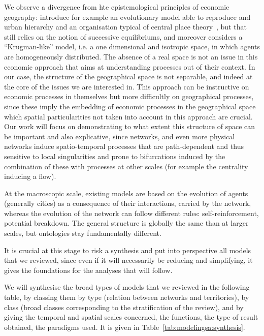 \documentclass[10pt]{article}
\begin{document}
We observe a divergence from hte epistemological principles of economic geography: \cite{fujita1999evolution} introduce for example an evolutionary model able to reproduce and urban hierarchy and an organisation typical of central place theory~\cite{banos2011christaller}, but that still relies on the notion of successive equilibriums, and moreover considers a ``Krugman-like'' model, i.e. a one dimensional and isotropic space, in which agents are homogeneously distributed. The absence of a real space is not an issue in this economic approach that aims at understanding processes out of their context. In our case, the structure of the geographical space is not separable, and indeed at the core of the issues we are interested in. This approach can be instructive on economic processes in themselves but more difficultly on geographical processes, since these imply the embedding of economic processes in the geographical space which spatial particularities not taken into account in this approach are crucial. Our work will focus on demonstrating to what extent this structure of space can be important and also explicative, since networks, and even more physical networks induce spatio-temporal processes that are path-dependent and thus sensitive to local singularities and prone to bifurcations induced by the combination of these with processes at other scales (for example the centrality inducing a flow).

At the macroscopic scale, existing models are based on the evolution of agents (generally cities) as a consequence of their interactions, carried by the network, whereas the evolution of the network can follow different rules: self-reinforcement, potential breakdown. The general structure is globally the same than at larger scales, but ontologies stay fundamentally different.

It is crucial at this stage to risk a synthesis and put into perspective all models that we reviewed, since even if it will necessarily be reducing and simplifying, it gives the foundations for the analyses that will follow.

We will synthesise the broad types of models that we reviewed in the following table, by classing them by type (relation between networks and territories), by class (broad classes corresponding to the stratification of the review), and by giving the temporal and spatial scales concerned, the functions, the type of result obtained, the paradigms used. It is given in Table~\ref{tab:modelingsa:synthesis}.
\end{document}
